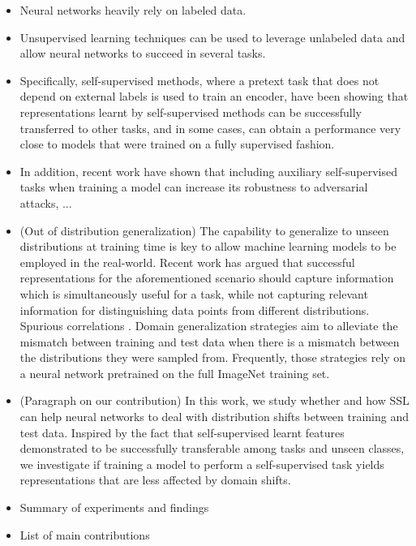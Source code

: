 \documentclass[runningheads]{llncs}
\begin{document}
\begin{itemize}
    \item Neural networks heavily rely on labeled data. 
    \item Unsupervised learning techniques can be used to leverage unlabeled data and allow neural networks to succeed in several tasks.
    \item Specifically, self-supervised methods, where a pretext task that does not depend on external labels is used to train an encoder, have been showing that representations learnt by self-supervised methods can be successfully transferred to other tasks, and in some cases, can obtain a performance very close to models that were trained on a fully supervised fashion.
    \item In addition, recent work have shown that including auxiliary self-supervised tasks when training a model can increase its robustness to adversarial attacks, ...
    \item (Out of distribution generalization)
    The capability to generalize to unseen distributions at training time is key to allow machine learning models to be employed in the real-world. Recent work has argued that successful representations for the aforementioned scenario should capture information which is simultaneously useful for a task, while not capturing relevant information for distinguishing data points from different distributions.
    Spurious correlations \cite{arjovsky2019invariant}. Domain generalization strategies aim to alleviate the mismatch between training and test data when there is a mismatch between the distributions they were sampled from. Frequently, those strategies rely on a neural network pretrained on the full ImageNet training set.  
    \item (Paragraph on our contribution) In this work, we study whether and how SSL can help neural networks to deal with distribution shifts between training and test data. Inspired by the fact that self-supervised learnt features demonstrated to be successfully transferable among tasks and unseen classes, we investigate if training a model to perform a self-supervised task yields representations that are less affected by domain shifts.    
    \item Summary of experiments and findings
    \item List of main contributions
\end{itemize}
\fi
\end{document}
